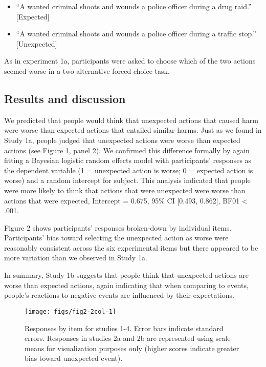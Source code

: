 \documentclass[10pt, letterpaper]{article}
\newenvironment{CodeChunk}{}{}
\begin{document}
\begin{itemize}
\item
  ``A wanted criminal shoots and wounds a police officer during a drug
  raid.'' {[}Expected{]}
\item
  ``A wanted criminal shoots and wounds a police officer during a
  traffic stop.'' {[}Unexpected{]}
\end{itemize}

As in experiment 1a, participants were asked to choose which of the two
actions seemed worse in a two-alternative forced choice task.

\subsection{Results and discussion}\label{results-and-discussion-1}

We predicted that people would think that unexpected actions that caused
harm were worse than expected actions that entailed similar harms. Just
as we found in Study 1a, people judged that unexpected actions were
worse than expected actions (see Figure 1, panel 2). We confirmed this
difference formally by again fitting a Bayesian logistic random effects
model with participants' responses as the dependent variable (1 =
unexpected action is worse; 0 = expected action is worse) and a random
intercept for subject. This analysis indicated that people were more
likely to think that actions that were unexpected were worse than
actions that were expected, Intercept = 0.675, 95\% CI {[}0.493,
0.862{]}, BF01 \textless{} .001.

Figure 2 shows participants' responses broken-down by individual items.
Participants' bias toward selecting the unexpected action as worse were
reasonably consistent across the six experimental items but there
appeared to be more variation than we observed in Study 1a.

In summary, Study 1b suggests that people think that unexpected actions
are worse than expected actions, again indicating that when comparing to
events, people's reactions to negative events are influenced by their
expectations.

\begin{CodeChunk}
\begin{figure*}[h]

{\centering \texttt{[image: figs/fig2-2col-1]} 

}

\caption[Responses by item for studies 1-4]{Responses by item for studies 1-4. Error bars indicate standard errors. Responses in studies 2a and 2b are represented using scale-means for visualization purposes only (higher scores indicate greater bias toward unexpected event).}\label{fig:fig2-2col}
\end{figure*}
\end{CodeChunk}
\end{document}
